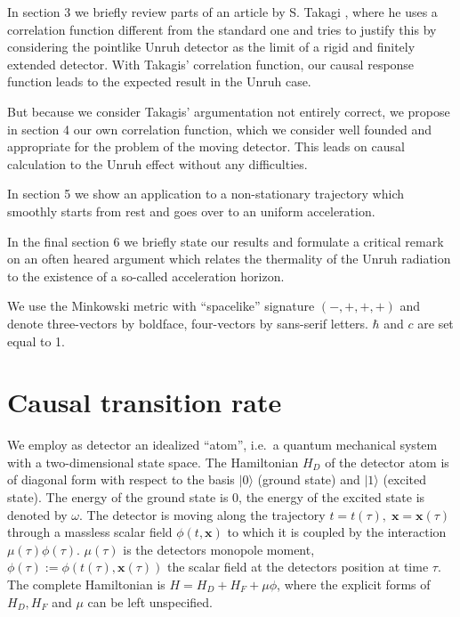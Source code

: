 \documentclass[a4paper,12pt]{article}
\newcommand{\ket}[1]{|#1\rangle }
\newcommand{\vx}{\mathbf{x}}
\begin{document}
In section 3 we briefly review parts of an article by S. Takagi \cite{tak}, where he uses 
a correlation function different from the standard one and tries to justify this by 
considering the pointlike Unruh detector as the limit of a rigid and finitely extended
detector. With Takagis' correlation function, our causal response function leads to the
expected result in the Unruh case.

But because we consider Takagis' argumentation not entirely correct, we propose in 
section 4 our own correlation function, which we consider well founded and appropriate
for the problem of the moving detector. This leads on causal calculation to the 
Unruh effect without any difficulties.

In section 5 we show an application to a non-stationary trajectory which smoothly
starts from rest and goes over to an uniform acceleration.

In the final section 6 we briefly state our results and formulate a critical
remark on an often heared argument which relates the thermality of the Unruh radiation 
to the existence of a so-called acceleration horizon.

\bigskip

We use the Minkowski metric with ``spacelike'' signature $(-,+,+,+)$ and denote
three-vectors by boldface,
four-vectors by sans-serif letters. $\hbar$ and $c$ are set equal to 1.




\section{Causal transition rate}

We employ as detector an idealized ``atom'', i.e.\ a quantum mechanical system
with a two-dimensional state space. The Hamiltonian $H_D$ of the
detector atom is of diagonal form with respect to the basis $\ket{0}$ (ground
state) and $\ket{1}$ (excited state). The energy of the ground state is $0$,
the energy of the excited state is denoted by $\omega$. The detector is moving
along the trajectory $t=t(\tau),\;\vx=\vx(\tau)$ through a massless
scalar field $\phi(t,\vx)$ to which it is coupled by the interaction
$\mu(\tau)\phi(\tau)$. $\mu(\tau)$ is the detectors monopole moment,
$\phi(\tau):=\phi(t(\tau),\vx(\tau))$ the scalar field at the detectors
position at time $\tau$. The complete Hamiltonian is $H=H_D+H_F+\mu\phi$, where
the explicit forms of $H_D, H_F$ and $\mu$ can be left unspecified.
\end{document}
